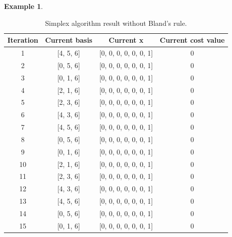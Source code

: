 \documentclass[a4paper,10 pt,titlepage,twoside]{report}
\theoremstyle{plain}
\theoremstyle{definition}
\newtheorem{ex}[thm]{Example}
\theoremstyle{remark}
\begin{document}
\begin{ex}
\begin{table}[h]
	\begin{center}
	\begin{tabular}{cccc}
		\hline
		\textbf{Iteration} & \textbf{Current basis} & \textbf{Current x} & \textbf{Current cost value} \\ \hline
		1 & [4, 5, 6] & [0, 0, 0, 0, 0, 0, 1] & 0 \\
		2 & [0, 5, 6] & [0, 0, 0, 0, 0, 0, 1] & 0 \\
		3 & [0, 1, 6] & [0, 0, 0, 0, 0, 0, 1] & 0 \\ 
		4 & [2, 1, 6] & [0, 0, 0, 0, 0, 0, 1] & 0 \\
		5 & [2, 3, 6] & [0, 0, 0, 0, 0, 0, 1] & 0 \\
		6 & [4, 3, 6] & [0, 0, 0, 0, 0, 0, 1] & 0 \\
		7 & [4, 5, 6] & [0, 0, 0, 0, 0, 0, 1] & 0 \\
		8 & [0, 5, 6] & [0, 0, 0, 0, 0, 0, 1] & 0 \\
		9 & [0, 1, 6] & [0, 0, 0, 0, 0, 0, 1] & 0 \\
		10 & [2, 1, 6] & [0, 0, 0, 0, 0, 0, 1] & 0 \\
		11 & [2, 3, 6] & [0, 0, 0, 0, 0, 0, 1] & 0 \\ 
		12 & [4, 3, 6] & [0, 0, 0, 0, 0, 0, 1] & 0 \\
		13 & [4, 5, 6] & [0, 0, 0, 0, 0, 0, 1] & 0 \\
		14 & [0, 5, 6] & [0, 0, 0, 0, 0, 0, 1] & 0 \\
		15 & [0, 1, 6] & [0, 0, 0, 0, 0, 0, 1] & 0 \\ \hline
	\end{tabular}\caption{Simplex algorithm result without Bland's rule.}
\end{center}
\end{table}
\end{ex} 
\end{document}
